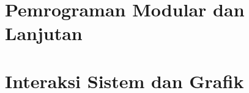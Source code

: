 \documentclass[a4paper,12pt]{book}
\begin{document}
\part{Pemrograman Modular dan Lanjutan}\label{part:advanced}




\part{Interaksi Sistem dan Grafik}\label{part:system}




\printbibliography[title=Daftar Pustaka]
\end{document}
